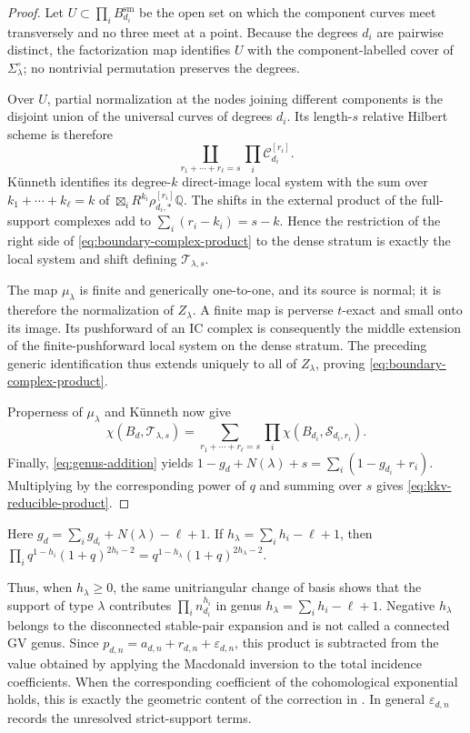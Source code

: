 \documentclass[11pt,reqno]{amsart}
\theoremstyle{definition}
\newcommand{\Q}{\mathbb Q}
\newcommand{\sm}{\mathrm{sm}}
\begin{document}
\begin{proof}
Let $U\subset\prod_iB_{d_i}^{\sm}$ be the open set on which the component
curves meet transversely and no three meet at a point.  Because the degrees
$d_i$ are pairwise distinct, the factorization map identifies $U$ with the
component-labelled cover of $\Sigma_\lambda^\circ$; no nontrivial
permutation preserves the degrees.

Over $U$, partial normalization at the nodes joining different components
is the disjoint union of the universal curves of degrees $d_i$.  Its
length-$s$ relative Hilbert scheme is therefore
\[
 \coprod_{r_1+\cdots+r_\ell=s}
 \prod_i\mathcal C_{d_i}^{[r_i]}.
\]
K\"unneth identifies its degree-$k$ direct-image local system with the sum
over $k_1+\cdots+k_\ell=k$ of
$\boxtimes_iR^{k_i}\rho_{d_i,*}^{[r_i]}\Q$.  The shifts in the external
product of the full-support complexes add to
$\sum_i(r_i-k_i)=s-k$.  Hence the restriction of the right side of
\eqref{eq:boundary-complex-product} to the dense stratum is exactly the
local system and shift defining $\mathcal T_{\lambda,s}$.

The map $\mu_\lambda$ is finite and generically one-to-one, and its source
is normal; it is therefore the normalization of $Z_\lambda$.  A finite map
is perverse $t$-exact and small onto its image.  Its pushforward of an IC
complex is consequently the middle extension of the finite-pushforward
local system on the dense stratum.  The preceding generic identification
thus extends uniquely to all of $Z_\lambda$, proving
\eqref{eq:boundary-complex-product}.

Properness of $\mu_\lambda$ and K\"unneth now give
\[
 \chi(B_d,\mathcal T_{\lambda,s})
 =\sum_{r_1+\cdots+r_\ell=s}
   \prod_i\chi(B_{d_i},\mathcal S_{d_i,r_i}).
\]
Finally, \eqref{eq:genus-addition} yields
$1-g_d+N(\lambda)+s=\sum_i(1-g_{d_i}+r_i)$.  Multiplying by the
corresponding power of $q$ and summing over $s$ gives
\eqref{eq:kkv-reducible-product}.
\end{proof}

Here $g_d=\sum_i g_{d_i}+N(\lambda)-\ell+1$.  If
$h_\lambda=\sum_i h_i-\ell+1$, then
$\prod_iq^{1-h_i}(1+q)^{2h_i-2}
=q^{1-h_\lambda}(1+q)^{2h_\lambda-2}$.

Thus, when $h_\lambda\ge0$, the same unitriangular change of basis shows that
the support of type $\lambda$ contributes $\prod_i n_{d_i}^{h_i}$ in genus
$h_\lambda=\sum_i h_i-\ell+1$.  Negative $h_\lambda$ belongs to the
disconnected stable-pair expansion and is not called a connected GV genus.
Since
$p_{d,n}=a_{d,n}+r_{d,n}+\varepsilon_{d,n}$, this product is subtracted from
the value obtained by applying the Macdonald inversion to the total incidence
coefficients.  When the corresponding coefficient of the cohomological
exponential holds, this is exactly the geometric content of the correction
in \cite[Equation~(5.6)]{KKV}.  In general $\varepsilon_{d,n}$ records the
unresolved strict-support terms.
\end{document}
